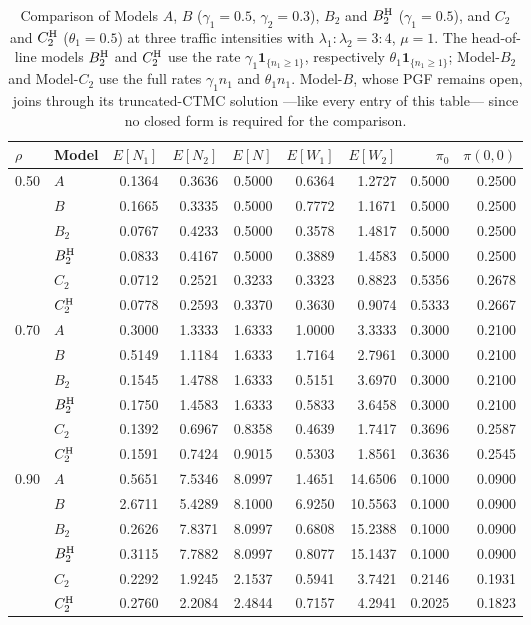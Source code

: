 \begin{table}[t]\centering
\caption{Comparison of Models $A$, $B$ ($\gamma_1=0.5$, $\gamma_2=0.3$), $B_2$ and $B_2^{\mathrm{H}}$ ($\gamma_1=0.5$), and $C_2$ and $C_2^{\mathrm{H}}$ ($\theta_1=0.5$) at three traffic intensities with $\lambda_1{:}\lambda_2=3{:}4$, $\mu=1$. The head-of-line models $B_2^{\mathrm{H}}$ and $C_2^{\mathrm{H}}$ use the rate $\gamma_1\mathbf{1}_{\{n_1\geq1\}}$, respectively $\theta_1\mathbf{1}_{\{n_1\geq1\}}$; Model-$B_2$ and Model-$C_2$ use the full rates $\gamma_1 n_1$ and $\theta_1 n_1$. Model-$B$, whose PGF remains open, joins through its truncated-CTMC solution ---like every entry of this table--- since no closed form is required for the comparison.}
\label{tab:comp:main}
\begin{tabular}{llrrrrrrr}
\toprule
$\rho$ & Model & $E[N_1]$ & $E[N_2]$ & $E[N]$ & $E[W_1]$ & $E[W_2]$ & $\pi_0$ & $\pi(0,0)$ \\
\midrule
\multirow{6}{*}{0.50} & $A$ & 0.1364 & 0.3636 & 0.5000 & 0.6364 & 1.2727 & 0.5000 & 0.2500 \\
 & $B$ & 0.1665 & 0.3335 & 0.5000 & 0.7772 & 1.1671 & 0.5000 & 0.2500 \\
 & $B_2$ & 0.0767 & 0.4233 & 0.5000 & 0.3578 & 1.4817 & 0.5000 & 0.2500 \\
 & $B_2^{\mathrm{H}}$ & 0.0833 & 0.4167 & 0.5000 & 0.3889 & 1.4583 & 0.5000 & 0.2500 \\
 & $C_2$ & 0.0712 & 0.2521 & 0.3233 & 0.3323 & 0.8823 & 0.5356 & 0.2678 \\
 & $C_2^{\mathrm{H}}$ & 0.0778 & 0.2593 & 0.3370 & 0.3630 & 0.9074 & 0.5333 & 0.2667 \\
\midrule
\multirow{6}{*}{0.70} & $A$ & 0.3000 & 1.3333 & 1.6333 & 1.0000 & 3.3333 & 0.3000 & 0.2100 \\
 & $B$ & 0.5149 & 1.1184 & 1.6333 & 1.7164 & 2.7961 & 0.3000 & 0.2100 \\
 & $B_2$ & 0.1545 & 1.4788 & 1.6333 & 0.5151 & 3.6970 & 0.3000 & 0.2100 \\
 & $B_2^{\mathrm{H}}$ & 0.1750 & 1.4583 & 1.6333 & 0.5833 & 3.6458 & 0.3000 & 0.2100 \\
 & $C_2$ & 0.1392 & 0.6967 & 0.8358 & 0.4639 & 1.7417 & 0.3696 & 0.2587 \\
 & $C_2^{\mathrm{H}}$ & 0.1591 & 0.7424 & 0.9015 & 0.5303 & 1.8561 & 0.3636 & 0.2545 \\
\midrule
\multirow{6}{*}{0.90} & $A$ & 0.5651 & 7.5346 & 8.0997 & 1.4651 & 14.6506 & 0.1000 & 0.0900 \\
 & $B$ & 2.6711 & 5.4289 & 8.1000 & 6.9250 & 10.5563 & 0.1000 & 0.0900 \\
 & $B_2$ & 0.2626 & 7.8371 & 8.0997 & 0.6808 & 15.2388 & 0.1000 & 0.0900 \\
 & $B_2^{\mathrm{H}}$ & 0.3115 & 7.7882 & 8.0997 & 0.8077 & 15.1437 & 0.1000 & 0.0900 \\
 & $C_2$ & 0.2292 & 1.9245 & 2.1537 & 0.5941 & 3.7421 & 0.2146 & 0.1931 \\
 & $C_2^{\mathrm{H}}$ & 0.2760 & 2.2084 & 2.4844 & 0.7157 & 4.2941 & 0.2025 & 0.1823 \\
\bottomrule
\end{tabular}
\end{table}
